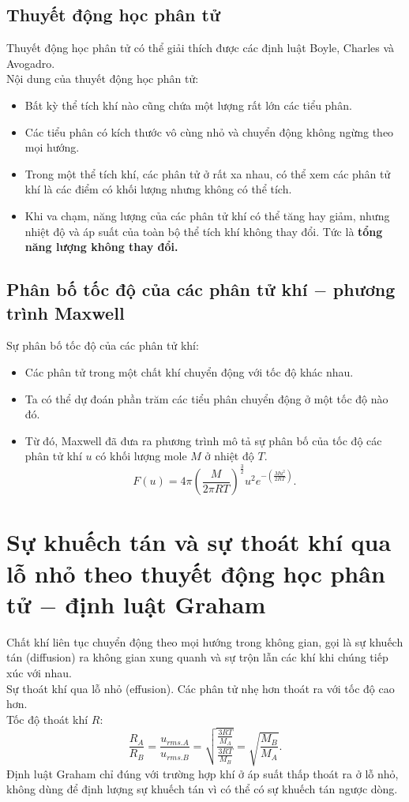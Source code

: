 \subsection{Thuyết động học phân tử}
Thuyết động học phân tử có thể giải thích được các định luật Boyle, Charles và Avogadro.\\
Nội dung của thuyết động học phân tử:
\begin{itemize}
\item Bất kỳ thể tích khí nào cũng chứa một lượng rất lớn các tiểu phân.
\item Các tiểu phân có kích thước vô cùng nhỏ và chuyển động không ngừng theo mọi hướng.
\item Trong một thể tích khí, các phân tử ở rất xa nhau, có thể xem các phân tử khí là các điểm có khối lượng nhưng không có thể tích.
\item Khi va chạm, năng lượng của các phân tử khí có thể tăng hay giảm, nhưng nhiệt độ và áp suất của toàn bộ thể tích khí không thay đổi. Tức là \textbf{tổng năng lượng không thay đổi.}
\end{itemize}
\subsection{Phân bố tốc độ của các phân tử khí $-$ phương trình Maxwell}
Sự phân bố tốc độ của các phân tử khí:
\begin{itemize}
\item Các phân tử trong một chất khí chuyển động với tốc độ khác nhau.
\item Ta có thể dự đoán phần trăm các tiểu phân chuyển động ở một tốc độ nào đó.
\item Từ đó, Maxwell đã đưa ra phương trình mô tả sự phân bố của tốc độ các phân tử khí $u$ có khối lượng mole $M$ ở nhiệt độ $T.$
$$F\left( u \right) = 4\pi {\left( {\frac{M}{{2\pi RT}}} \right)^{\frac{3}{2}}}{u^2}{e^{ - \left( {\frac{{M{u^2}}}{{2RT}}} \right)}}.$$
\end{itemize}
\section{Sự khuếch tán và sự thoát khí qua lỗ nhỏ theo thuyết động học phân tử $-$ định luật Graham}
Chất khí liên tục chuyển động theo mọi hướng trong không gian, gọi là sự khuếch tán (diffusion) ra không gian xung quanh và sự trộn lẫn các khí khi chúng tiếp xúc với nhau.\\
Sự thoát khí qua lỗ nhỏ (effusion). Các phân tử nhẹ hơn thoát ra với tốc độ cao hơn.\\
Tốc độ thoát khí $R:$
$$\frac{{{R_A}}}{{{R_B}}} = \frac{{{u_{rms.A}}}}{{{u_{rms.B}}}} = \sqrt {\frac{{\frac{{3RT}}{{{M_A}}}}}{{\frac{{3RT}}{{{M_B}}}}}}  = \sqrt {\frac{{{M_B}}}{{{M_A}}}} .$$
Định luật Graham chỉ đúng với trường hợp khí ở áp suất thấp thoát ra ở lỗ nhỏ, không dùng để định lượng sự khuếch tán vì có thể có sự khuếch tán ngược dòng.

